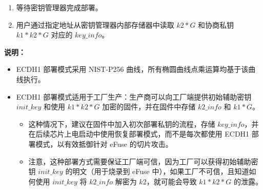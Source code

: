 \documentclass[main\_\_CN.tex]{subfiles}
\begin{document}
\begin{enumerate}
\begin{enumerate}
        \item 等待密钥管理器完成部署。
        \item 用户通过指定地址从密钥管理器内部存储器中读取 \hyperref[para:k2G]{\begin{math}k2*G\end{math}} 和协商私钥 \hyperref[para:k1k2G]{\begin{math}k1*k2*G\end{math}} 对应的 \hyperref[para:keyinfo]{\begin{math}key\_info\end{math}}。
    \end{enumerate}
\end{enumerate}

\textbf{说明：}\\

\begin{itemize}
    \item ECDH1 部署模式采用 NIST-P256 曲线，所有椭圆曲线点乘运算均基于该曲线执行。
    \item ECDH1 部署模式适用于工厂生产：生产商可以向工厂端提供初始辅助密钥 \hyperref[para:initkey]{\begin{math}init\_key\end{math}} 
    和使用 \hyperref[para:k1k2G]{\begin{math}k1*k2*G\end{math}} 加密的固件，并在固件中存储 \hyperref[para:k2info]{\begin{math}k2\_info\end{math}} 和 \hyperref[para:k1G]{\begin{math}k1*G\end{math}}。
    \begin{itemize}
        \item 这种情况下，建议在固件中加入初次部署私钥的流程，存储 \hyperref[para:keyinfo]{\begin{math}key\_info\end{math}}，并在后续芯片上电启动中使用恢复部署模式，而不是每次都使用 ECDH1 部署模式，以有效抵御针对 eFuse 的切片攻击。
        \item 注意，这种部署方式需要保证工厂端可信，因为工厂可以获得初始辅助密钥 \hyperref[para:initkey]{\begin{math}init\_key\end{math}} 的明文（用于烧录到 eFuse 中），如果工厂不可信，且知道如何使用 \hyperref[para:initkey]{\begin{math}init\_key\end{math}} 将 \hyperref[para:k2info]{\begin{math}k2\_info\end{math}} 解密为 \hyperref[para:k2]{\begin{math}k2\end{math}}，就可能会导致 \hyperref[para:k1k2G]{\begin{math}k1*k2*G\end{math}} 的泄露。

\end{itemize}
\end{itemize}
\end{document}
